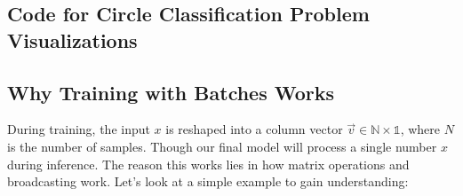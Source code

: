 \subsection{Code for Circle Classification Problem Visualizations}
\label{sec:circle-classification-visualizations}


\subsection{Why Training with Batches Works}
\label{sec:training-with-batches}
During training, the input $x$ is reshaped into a column vector $\vec{v}\in\mathbb{N\times 1}$, where $N$ is the number of samples. Though our final model will process a single number $x$ during inference. The reason this works lies in how matrix operations and broadcasting work. Let's look at a simple example to gain understanding:

